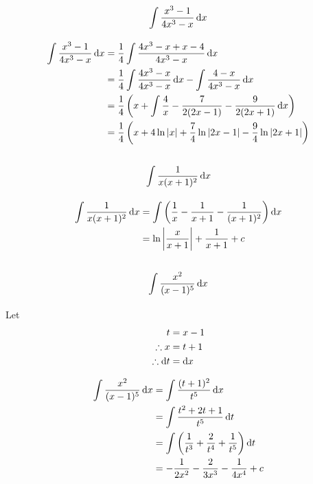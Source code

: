 \documentclass[fleqn, a4paper]{article}
\begin{document}
\subsection{\[\int \dfrac{x^3 - 1}{4x^3 - x} \dif x\]}

\begin{align*}
	\int \dfrac{x^3 - 1}{4x^3 - x} \dif x &= \dfrac{1}{4} \int \dfrac{4x^3 - x + x - 4}{4x^3 - x} \dif x\\
	&= \dfrac{1}{4} \int \dfrac{4x^3 - x}{4x^3 - x} \dif x - \int \dfrac{4 - x}{4x^3 - x} \dif x\\
	&= \dfrac{1}{4} \left( x + \int \dfrac{4}{x} - \dfrac{7}{2(2x - 1)} - \dfrac{9}{2(2x + 1)} \dif x \right)\\
	&= \dfrac{1}{4} \left( x + 4 \ln |x| + \dfrac{7}{4} \ln |2x - 1| - \dfrac{9}{4} \ln |2x + 1| \right)
\end{align*}

\subsection{\[\int \dfrac{1}{x(x + 1)^2} \dif x\]}

\begin{align*}
	\int \dfrac{1}{x(x + 1)^2} \dif x &= \int \left( \dfrac{1}{x} - \dfrac{1}{x +1} -\dfrac{1}{(x + 1)^2} \right) \dif x\\
	&= \ln \left\lvert \dfrac{x}{x + 1} \right\rvert + \dfrac{1}{x + 1} + c
\end{align*}

\subsection{\[\int \dfrac{x^2}{(x - 1)^5} \dif x\]}

Let
\begin{align*}
	t &= x - 1\\
	\therefore x &= t + 1\\
	\therefore \dif t &= \dif x
\end{align*}

\begin{align*}
	\int \dfrac{x^2}{(x - 1)^5} \dif x &= \int \dfrac{(t + 1)^2}{t^5} \dif x\\
	&= \int \dfrac{t^2 + 2t + 1}{t^5} \dif t\\
	&= \int \left( \dfrac{1}{t^3} + \dfrac{2}{t^4} + \dfrac{1}{t^5} \right) \dif t\\
	&= -\dfrac{1}{2x^2} - \dfrac{2}{3x^3} - \dfrac{1}{4x^4} + c
\end{align*}
\end{document}
